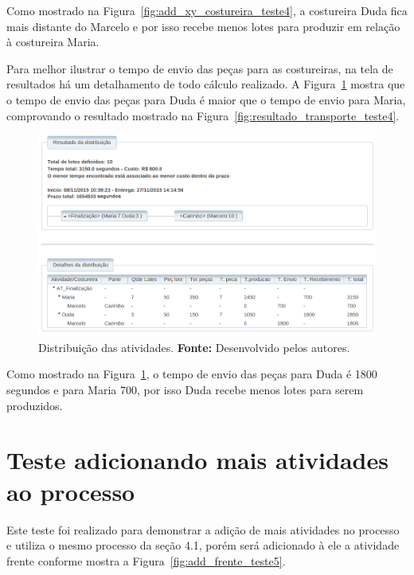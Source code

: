 \par Como mostrado na Figura~\ref{fig:add_xy_costureira_teste4}, a costureira
Duda fica mais distante do Marcelo e por isso recebe menos lotes para produzir em
relação à costureira Maria.

\par Para melhor ilustrar o tempo de envio das peças para as costureiras, na tela
de resultados há um detalhamento de todo cálculo realizado. A
Figura~\ref{fig:detalhameneto_transporte_teste4} mostra que o tempo de envio das peças para Duda é 
maior que o tempo de envio para Maria, comprovando o resultado mostrado na
Figura~\ref{fig:resultado_transporte_teste4}.

\begin{figure}[h!]
	\centerline{\includegraphics[width=13cm]{./imagens/detalhamento_transporte_teste4.png}}
	\caption[Distribuição das atividades.] 
	{Distribuição das atividades. \textbf{Fonte:} Desenvolvido pelos autores.}
	\label{fig:detalhameneto_transporte_teste4}
\end{figure}

\par Como mostrado na Figura~\ref{fig:detalhameneto_transporte_teste4}, o tempo
de envio das peças para Duda é 1800 segundos e para Maria 700, por isso
Duda recebe menos lotes para serem produzidos.


\section{Teste adicionando mais atividades ao processo}

\par Este teste foi realizado para demonstrar a adição de mais atividades no
processo e utiliza o mesmo processo da seção 4.1, porém será adicionado
à ele a atividade frente conforme mostra a Figura~\ref{fig:add_frente_teste5}.

